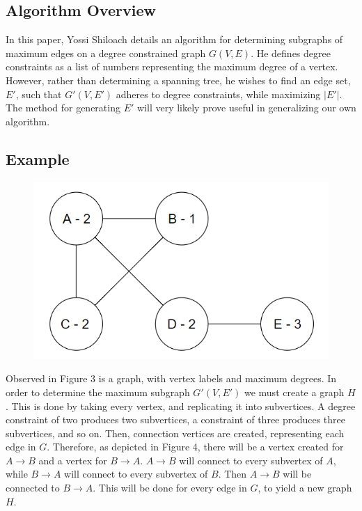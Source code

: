 \documentclass{article}
\begin{document}
	\subsection{Algorithm Overview}
	In this paper, Yossi Shiloach details an algorithm for determining subgraphs of maximum edges on a degree constrained graph $G(V,E)$. He defines
	degree constraints as a list of numbers representing the maximum degree of a vertex. However, rather than determining a spanning tree, he wishes to find an edge set, $E'$, such that $G'(V,E')$ adheres to degree constraints, while maximizing $|E'|$. The method for generating $E'$ will very likely  prove useful in generalizing our own algorithm.
	\subsection{Example}
	
		\begin{figure}[H]
			\caption{}
			\includegraphics{Figure3}
		\end{figure}
	
	Observed in Figure 3 is a graph, with vertex labels and maximum degrees. In order to determine the maximum subgraph $G'(V,E')$ we must create a graph $H$. This is done by taking every vertex, and replicating it into subvertices. A degree constraint of two produces two subvertices, a constraint of three produces three subvertices, and so on. Then, connection vertices are created, representing each edge in $G$. Therefore, as depicted in Figure 4, there will be a vertex created for $A\rightarrow B$ and a vertex for $B\rightarrow A$. $A\rightarrow B$ will connect to every subvertex of $A$, while  $B\rightarrow A$ will connect to every subvertex of $B$. Then $A\rightarrow B$ will be connected to  $B\rightarrow A$. This will be done for every edge in $G$, to yield a new graph $H$.
	
\end{document}
